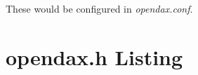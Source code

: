 These would be configured in \textit{opendax.conf}.

\appendix



%


\chapter{opendax.h Listing}


%

\printindex

